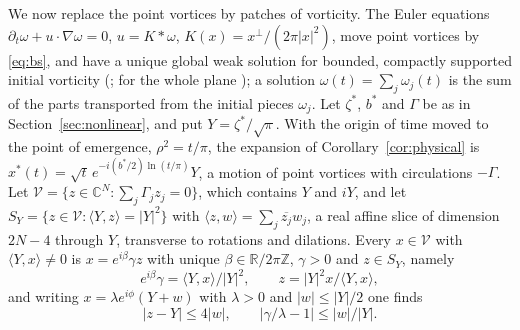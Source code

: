 \documentclass[11pt]{article}
\theoremstyle{definition}
\newcommand{\C}{\mathbb{C}}
\newcommand{\R}{\mathbb{R}}
\begin{document}
We now replace the point vortices by patches of vorticity. The Euler equations $\partial_t\omega + u\cdot\nabla\omega = 0$, $u = K*\omega$, $K(x) = x^\perp/(2\pi|x|^2)$, move point vortices by \eqref{eq:bs}, and have a unique global weak solution for bounded, compactly supported initial vorticity (\cite{yudovich1963}; for the whole plane \cite[Theorems~1.6 and~3.3]{cs2024}); a solution $\omega(t) = \sum_j\omega_j(t)$ is the sum of the parts transported from the initial pieces $\omega_j$. Let $\zeta^*$, $b^*$ and $\Gamma$ be as in Section~\ref{sec:nonlinear}, and put $Y = \zeta^*/\sqrt\pi$. With the origin of time moved to the point of emergence, $\rho^2 = t/\pi$, the expansion of Corollary~\ref{cor:physical} is $x^*(t) = \sqrt t\,e^{-i(b^*/2)\ln(t/\pi)}Y$, a motion of point vortices with circulations $-\Gamma$. Let $\mathcal V = \{z \in \C^N: \sum_j\Gamma_jz_j = 0\}$, which contains $Y$ and $iY$, and let $S_Y = \{z \in \mathcal V: \langle Y, z\rangle = |Y|^2\}$ with $\langle z, w\rangle = \sum_j\overline{z_j}w_j$, a real affine slice of dimension $2N - 4$ through $Y$, transverse to rotations and dilations. Every $x \in \mathcal V$ with $\langle Y, x\rangle \ne 0$ is $x = e^{i\beta}\gamma z$ with unique $\beta \in \R/2\pi\mathbb Z$, $\gamma > 0$ and $z \in S_Y$, namely
\begin{equation}\label{eq:slice}
  e^{i\beta}\gamma = \langle Y, x\rangle/|Y|^2,\qquad z = |Y|^2x/\langle Y, x\rangle,
\end{equation}
and writing $x = \lambda e^{i\phi}(Y + w)$ with $\lambda > 0$ and $|w| \le |Y|/2$ one finds
\begin{equation}\label{eq:slicebound}
  |z - Y| \le 4|w|,\qquad |\gamma/\lambda - 1| \le |w|/|Y|.
\end{equation}
\end{document}
